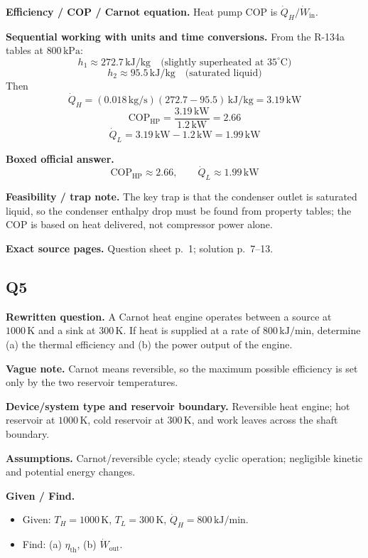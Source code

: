 \textbf{Efficiency / COP / Carnot equation.} Heat pump COP is $\dot Q_H/\dot W_{\text{in}}$.

\textbf{Sequential working with units and time conversions.} From the R-134a tables at $800\,\text{kPa}$:
\[
h_1 \approx 272.7\,\text{kJ/kg}\quad\text{(slightly superheated at }35^\circ\text{C)}
\]
\[
h_2 \approx 95.5\,\text{kJ/kg}\quad\text{(saturated liquid)}
\]
Then
\[
\dot Q_H = (0.018\,\text{kg/s})(272.7-95.5)\,\text{kJ/kg}
= 3.19\,\text{kW}
\]
\[
\mathrm{COP}_{\mathrm{HP}} = \frac{3.19\,\text{kW}}{1.2\,\text{kW}} = 2.66
\]
\[
\dot Q_L = 3.19\,\text{kW} - 1.2\,\text{kW} = 1.99\,\text{kW}
\]

\textbf{Boxed official answer.}
\[
\boxed{\mathrm{COP}_{\mathrm{HP}} \approx 2.66, \qquad \dot Q_L \approx 1.99\,\text{kW}}
\]

\textbf{Feasibility / trap note.} The key trap is that the condenser outlet is saturated liquid, so the condenser enthalpy drop must be found from property tables; the COP is based on heat delivered, not compressor power alone.

\textbf{Exact source pages.} Question sheet p.~1; solution p.~7--13.

\subsection*{Q5}
\textbf{Rewritten question.} A Carnot heat engine operates between a source at $1000\,\text{K}$ and a sink at $300\,\text{K}$. If heat is supplied at a rate of $800\,\text{kJ/min}$, determine (a) the thermal efficiency and (b) the power output of the engine.

\textbf{Vague note.} Carnot means reversible, so the maximum possible efficiency is set only by the two reservoir temperatures.

\textbf{Device/system type and reservoir boundary.} Reversible heat engine; hot reservoir at $1000\,\text{K}$, cold reservoir at $300\,\text{K}$, and work leaves across the shaft boundary.

\textbf{Assumptions.} Carnot/reversible cycle; steady cyclic operation; negligible kinetic and potential energy changes.

\textbf{Given / Find.}
\begin{itemize}
  \item Given: $T_H=1000\,\text{K}$, $T_L=300\,\text{K}$, $\dot Q_H=800\,\text{kJ/min}$.
  \item Find: (a) $\eta_{\text{th}}$, (b) $\dot W_{\text{out}}$.
\end{itemize}

